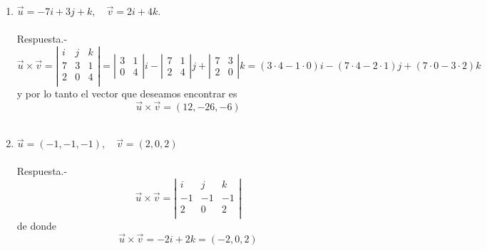 \begin{enumerate}
\begin{enumerate}[\bfseries a)]
    \item $\vec{u}=-7i+3j+k, \quad \vec{v}=2i+4k$.\\\\
	Respuesta.-\;
	$$\vec{u}\times \vec{v} = \left|\begin{array}{ccc}
	    i&j&k\\
	    7&3&1\\
	    2&0&4\\
	\end{array}\right|=\left|\begin{array}{cc}3&1\\ 0&4 \end{array}\right|i - \left|\begin{array}{cc} 7&1\\2&4 \end{array}\right|j + \left|\begin{array}{cc} 7&3\\2&0 \end{array}\right|k=(3\cdot 4 - 1\cdot 0)i - (7\cdot 4-2\cdot 1)j+(7\cdot 0 - 3\cdot 2)k$$
	y por lo tanto el vector que deseamos encontrar es $$\vec{u}\times \vec{v}=(12,-26,-6)$$\\

    \item $\vec{u}=(-1,-1,-1), \quad \vec{v}=(2,0,2)$\\\\
	Respuesta.-\;
	$$\vec{u}\times \vec{v} = \left|\begin{array}{rrr}
	    i&j&k\\
	    -1&-1&-1\\
	    2&0&2\\
	\end{array}\right|$$
	de donde $$\vec{u}\times \vec{v} = -2i +2k = (-2,0,2)$$\\

\end{enumerate}


\end{enumerate}
